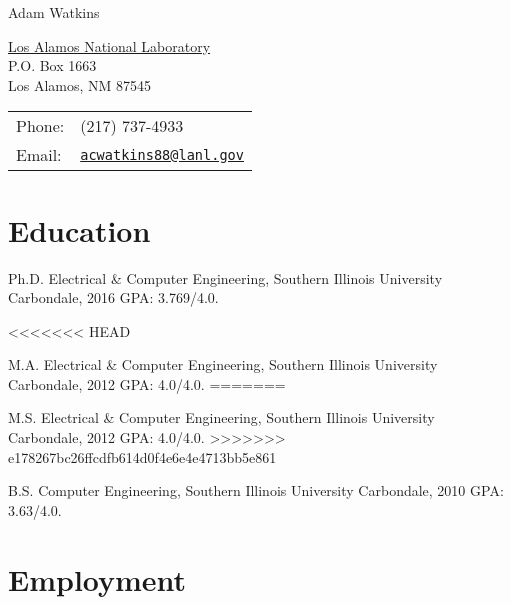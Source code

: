 \documentclass[letterpaper]{article}
\def\name{Adam Watkins}
\renewenvironment{itemize}{
  \begin{list}{}{
    \setlength{\leftmargin}{1.5em}
  }
}{
  \end{list}
}
\begin{document}
{\huge \name}


\vspace{0.25in}

\begin{minipage}{0.45\linewidth}
  \href{}{Los Alamos National Laboratory} \\
  P.O. Box 1663  \\
  Los Alamos, NM 87545
\end{minipage}
\begin{minipage}{0.45\linewidth}
  \begin{tabular}{ll}
    Phone: & (217) 737-4933 \\
    Email: & \href{mailto:acwatkins88@lanl.gov}{\tt acwatkins88@lanl.gov} \\
  \end{tabular}
\end{minipage}


\section*{Education}

\begin{itemize}
	
\item Ph.D. Electrical \& Computer Engineering, Southern Illinois University Carbondale, 2016 GPA: 3.769/4.0.
 
<<<<<<< HEAD
\item M.A. Electrical \& Computer Engineering, Southern Illinois University Carbondale, 2012 GPA: 4.0/4.0.
=======
\item M.S. Electrical \& Computer Engineering, Southern Illinois University Carbondale, 2012 GPA: 4.0/4.0.
>>>>>>> e178267bc26ffcdfb614d0f4e6e4e4713bb5e861

\item B.S. Computer Engineering, Southern Illinois University Carbondale, 2010 GPA: 3.63/4.0.

\end{itemize}


\section*{Employment}
\end{document}
